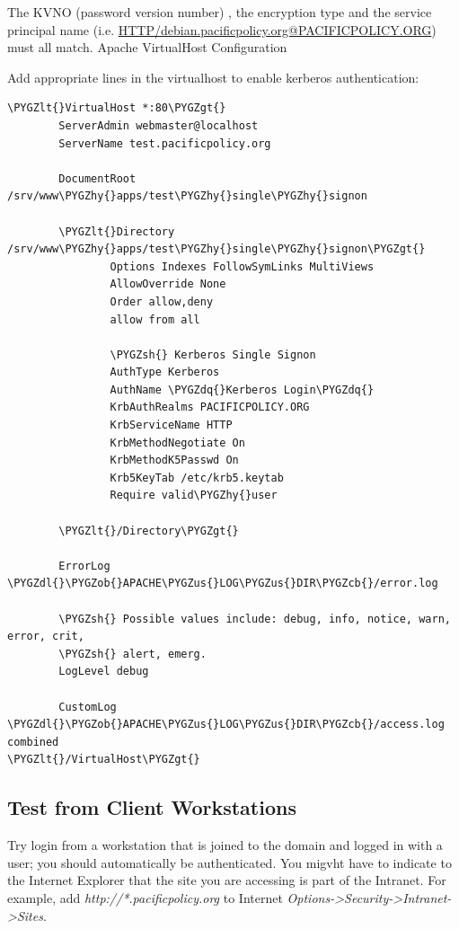\documentclass[letterpaper,10pt,english]{sphinxmanual}
\def\PYGZus{\char`\_}
\def\PYGZob{\char`\{}
\def\PYGZcb{\char`\}}
\def\PYGZlt{\char`\<}
\def\PYGZgt{\char`\>}
\def\PYGZsh{\char`\#}
\def\PYGZdl{\char`\$}
\def\PYGZhy{\char`\-}
\def\PYGZdq{\char`\"}
\begin{document}
The KVNO (password version number) , the encryption type and the
service principal name (i.e. \href{mailto:HTTP/debian.pacificpolicy.org@PACIFICPOLICY.ORG}{HTTP/debian.pacificpolicy.org@PACIFICPOLICY.ORG}) must
all match.  Apache VirtualHost Configuration

Add appropriate lines in the virtualhost to enable kerberos
authentication:

\begin{Verbatim}[commandchars=\\\{\}]
\PYGZlt{}VirtualHost *:80\PYGZgt{}
        ServerAdmin webmaster@localhost
        ServerName test.pacificpolicy.org

        DocumentRoot /srv/www\PYGZhy{}apps/test\PYGZhy{}single\PYGZhy{}signon

        \PYGZlt{}Directory /srv/www\PYGZhy{}apps/test\PYGZhy{}single\PYGZhy{}signon\PYGZgt{}
                Options Indexes FollowSymLinks MultiViews
                AllowOverride None
                Order allow,deny
                allow from all

                \PYGZsh{} Kerberos Single Signon
                AuthType Kerberos
                AuthName \PYGZdq{}Kerberos Login\PYGZdq{}
                KrbAuthRealms PACIFICPOLICY.ORG
                KrbServiceName HTTP
                KrbMethodNegotiate On
                KrbMethodK5Passwd On
                Krb5KeyTab /etc/krb5.keytab
                Require valid\PYGZhy{}user

        \PYGZlt{}/Directory\PYGZgt{}

        ErrorLog \PYGZdl{}\PYGZob{}APACHE\PYGZus{}LOG\PYGZus{}DIR\PYGZcb{}/error.log

        \PYGZsh{} Possible values include: debug, info, notice, warn, error, crit,
        \PYGZsh{} alert, emerg.
        LogLevel debug

        CustomLog \PYGZdl{}\PYGZob{}APACHE\PYGZus{}LOG\PYGZus{}DIR\PYGZcb{}/access.log combined
\PYGZlt{}/VirtualHost\PYGZgt{}
\end{Verbatim}


\subsection{Test from Client Workstations}
\label{administrator-guide:test-from-client-workstations}
Try login from a workstation that is joined to the domain and logged
in with a user; you should automatically be authenticated. You migvht
have to indicate to the Internet Explorer that the site you are
accessing is part of the Intranet. For example, add
\emph{http://*.pacificpolicy.org} to Internet \emph{Options-\textgreater{}Security-\textgreater{}Intranet-\textgreater{}Sites}.
\end{document}
